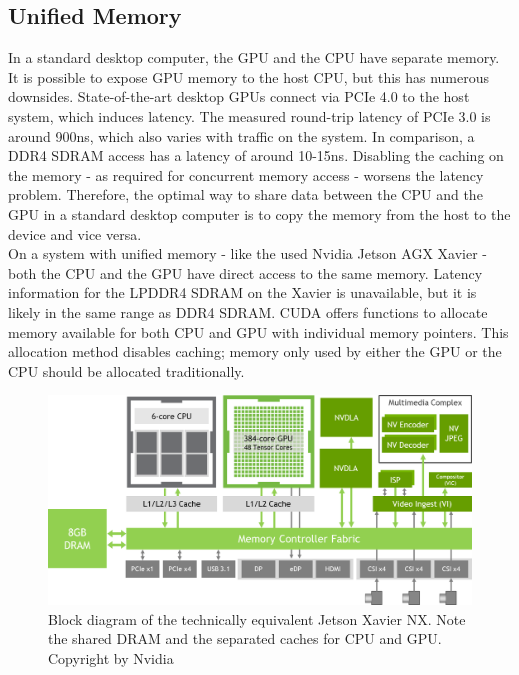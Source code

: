 \subsection{Unified Memory}
\label{sec:unifiedMemory}
In a standard desktop computer, the GPU and the CPU have separate memory. It is possible to expose GPU memory to the host CPU, but this has numerous downsides. State-of-the-art desktop GPUs connect via PCIe 4.0 to the host system, which induces latency. The measured round-trip latency of PCIe 3.0 is around 900ns\cite{PCIe_performance}, which also varies with traffic on the system. In comparison, a DDR4 SDRAM access has a latency of around 10-15ns\cite{Wiki_CAS}. Disabling the caching on the memory - as required for concurrent memory access - worsens the latency problem. Therefore, the optimal way to share data between the CPU and the GPU in a standard desktop computer is to copy the memory from the host to the device and vice versa.\\
On a system with unified memory - like the used Nvidia Jetson AGX Xavier - both the CPU and the GPU have direct access to the same memory. Latency information for the LPDDR4 SDRAM on the Xavier is unavailable, but it is likely in the same range as DDR4 SDRAM. CUDA offers functions to allocate memory available for both CPU and GPU with individual memory pointers. This allocation method disables caching; memory only used by either the GPU or the CPU should be allocated traditionally.\\
\begin{figure}[H]
    \centering
    \includegraphics[width=1.0\textwidth]{images/Jetson_Xavier_NX_Block_Diagram.png}
    \caption{Block diagram of the technically equivalent Jetson Xavier NX. Note the shared DRAM and the separated caches for CPU and GPU. Copyright by Nvidia}
    \label{im:XavierNX}
\end{figure}
